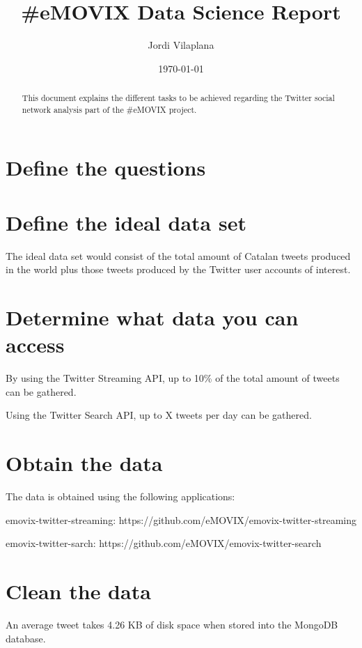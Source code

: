 \documentclass[a4paper]{article}
\title{\#eMOVIX Data Science Report}
\author{Jordi Vilaplana}
\date{\today}
\begin{document}
\maketitle

\begin{abstract}
This document explains the different tasks to be achieved regarding the Twitter social network analysis part of the \#eMOVIX project.
\end{abstract}

\section{Define the questions}
\label{sec:questions_definition}



\section{Define the ideal data set}

The ideal data set would consist of the total amount of Catalan tweets produced in the world plus those tweets produced by the Twitter user accounts of interest.

\section{Determine what data you can access}

By using the Twitter Streaming API, up to 10\% of the total amount of tweets can be gathered.

Using the Twitter Search API, up to X tweets per day can be gathered.

\section{Obtain the data}

The data is obtained using the following applications:

emovix-twitter-streaming: https://github.com/eMOVIX/emovix-twitter-streaming

emovix-twitter-sarch: https://github.com/eMOVIX/emovix-twitter-search

\section{Clean the data}

An average tweet takes 4.26 KB of disk space when stored into the MongoDB database.
\end{document}
